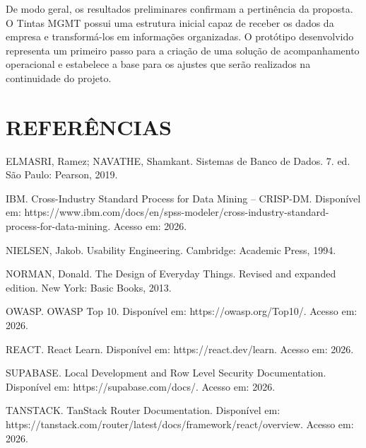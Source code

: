\documentclass[12pt,a4paper]{article}
\begin{document}
De modo geral, os resultados preliminares confirmam a pertinência da proposta. O Tintas MGMT possui uma estrutura inicial capaz de receber os dados da empresa e transformá-los em informações organizadas. O protótipo desenvolvido representa um primeiro passo para a criação de uma solução de acompanhamento operacional e estabelece a base para os ajustes que serão realizados na continuidade do projeto.

\newpage
\section{REFERÊNCIAS}
ELMASRI, Ramez; NAVATHE, Shamkant. Sistemas de Banco de Dados. 7. ed. São Paulo: Pearson, 2019.

IBM. Cross-Industry Standard Process for Data Mining – CRISP-DM. Disponível em: https://www.ibm.com/docs/en/spss-modeler/cross-industry-standard-process-for-data-mining. Acesso em: 2026.

NIELSEN, Jakob. Usability Engineering. Cambridge: Academic Press, 1994.

NORMAN, Donald. The Design of Everyday Things. Revised and expanded edition. New York: Basic Books, 2013.

OWASP. OWASP Top 10. Disponível em: https://owasp.org/Top10/. Acesso em: 2026.

REACT. React Learn. Disponível em: https://react.dev/learn. Acesso em: 2026.

SUPABASE. Local Development and Row Level Security Documentation. Disponível em: https://supabase.com/docs/. Acesso em: 2026.

TANSTACK. TanStack Router Documentation. Disponível em: https://tanstack.com/router/latest/docs/framework/react/overview. Acesso em: 2026.
\end{document}
